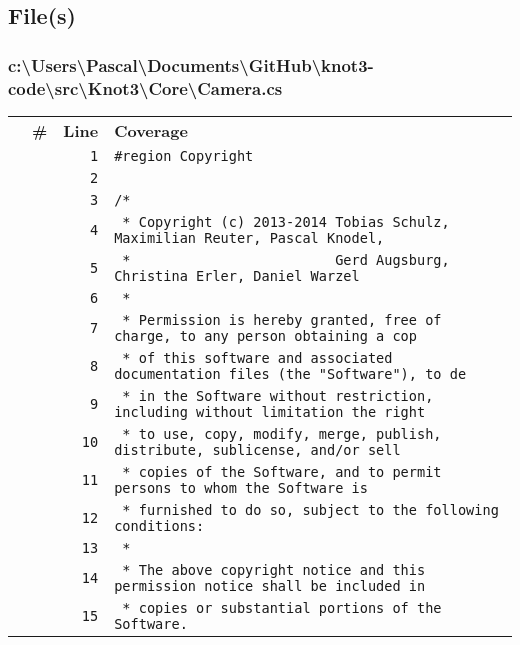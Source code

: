 \documentclass[a4paper,10pt]{article}
\begin{document}
\subsection{File(s)}
\subsubsection{c:\textbackslash Users\textbackslash Pascal\textbackslash Documents\textbackslash GitHub\textbackslash knot3-code\textbackslash src\textbackslash Knot3\textbackslash Core\textbackslash Camera.cs}
\begin{longtable}[l]{lrrl}
\textbf{} & \textbf{\#} & \textbf{Line} & \textbf{Coverage}\\
\cellcolor{gray} &  & \verb~1~ & \verb~#region Copyright~\\
\cellcolor{gray} &  & \verb~2~ & \verb~~\\
\cellcolor{gray} &  & \verb~3~ & \verb~/*~\\
\cellcolor{gray} &  & \verb~4~ & \verb~ * Copyright (c) 2013-2014 Tobias Schulz, Maximilian Reuter, Pascal Knodel,~\\
\cellcolor{gray} &  & \verb~5~ & \verb~ *                         Gerd Augsburg, Christina Erler, Daniel Warzel~\\
\cellcolor{gray} &  & \verb~6~ & \verb~ *~\\
\cellcolor{gray} &  & \verb~7~ & \verb~ * Permission is hereby granted, free of charge, to any person obtaining a cop~\\
\cellcolor{gray} &  & \verb~8~ & \verb~ * of this software and associated documentation files (the "Software"), to de~\\
\cellcolor{gray} &  & \verb~9~ & \verb~ * in the Software without restriction, including without limitation the right~\\
\cellcolor{gray} &  & \verb~10~ & \verb~ * to use, copy, modify, merge, publish, distribute, sublicense, and/or sell~\\
\cellcolor{gray} &  & \verb~11~ & \verb~ * copies of the Software, and to permit persons to whom the Software is~\\
\cellcolor{gray} &  & \verb~12~ & \verb~ * furnished to do so, subject to the following conditions:~\\
\cellcolor{gray} &  & \verb~13~ & \verb~ *~\\
\cellcolor{gray} &  & \verb~14~ & \verb~ * The above copyright notice and this permission notice shall be included in ~\\
\cellcolor{gray} &  & \verb~15~ & \verb~ * copies or substantial portions of the Software.~\\

\end{longtable}
\end{document}
